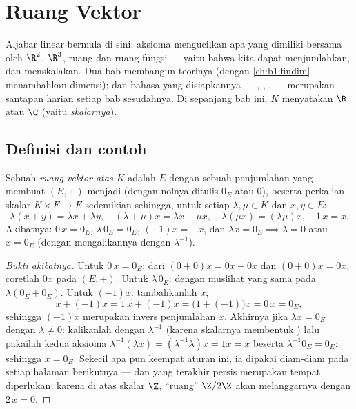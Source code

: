 \chapter{Ruang Vektor}\label{ch:b1:vspaces}

Aljabar linear bermula di sini: aksioma  mengucilkan apa yang
dimiliki bersama oleh $\R^2$, $\R^3$, ruang  dan ruang fungsi
--- yaitu bahwa kita dapat menjumlahkan, dan menskalakan. Dua bab membangun teorinya
(dengan \cref{ch:b1:findim} menambahkan dimensi); dan bahasa yang disiapkannya ---
, , ,  --- merupakan santapan harian setiap
bab sesudahnya. Di sepanjang bab ini, $K$ menyatakan $\R$ atau $\C$
(yaitu \emph{skalarnya}).

\section{Definisi dan contoh}

\begin{definition}\label{def:b1:vspaces:def}
Sebuah \emph{ruang vektor atas $K$} adalah  $E$ dengan sebuah
penjumlahan yang membuat $(E, +)$ menjadi  (dengan nolnya ditulis $0_E$ atau
$0$), beserta perkalian skalar $K \times E \to E$ sedemikian sehingga, untuk
setiap $\lambda, \mu \in K$ dan $x, y \in E$:
\[
\lambda(x + y) = \lambda x + \lambda y,\quad
(\lambda + \mu) x = \lambda x + \mu x,\quad
\lambda(\mu x) = (\lambda\mu) x,\quad
1\,x = x .
\]
Akibatnya: $0\,x = 0_E$, $\lambda\,0_E = 0_E$, $(-1)x = -x$, dan
$\lambda x = 0_E \implies \lambda = 0$ atau $x = 0_E$ (dengan mengalikannya dengan
$\lambda^{-1}$).
\end{definition}

\begin{proof}[Bukti akibatnya]
Untuk $0\,x = 0_E$: dari $(0 + 0)x = 0x + 0x$ dan $(0+0)x = 0x$,
coretlah $0x$ pada  $(E, +)$. Untuk $\lambda\,0_E$: dengan muslihat
yang sama pada $\lambda(0_E + 0_E)$. Untuk $(-1)x$: tambahkanlah $x$,
\[
x + (-1)x = 1\,x + (-1)x = \bigl(1 + (-1)\bigr)x = 0\,x = 0_E ,
\]
sehingga $(-1)x$ merupakan invers penjumlahan $x$. Akhirnya jika $\lambda x
= 0_E$ dengan $\lambda \neq 0$: kalikanlah dengan $\lambda^{-1}$ (karena
skalarnya membentuk ) lalu pakailah kedua aksioma
$\lambda^{-1}(\lambda x) = (\lambda^{-1}\lambda)x = 1x = x$
beserta $\lambda^{-1}0_E = 0_E$: sehingga $x = 0_E$. Sekecil apa pun
keempat aturan ini, ia dipakai diam-diam pada setiap halaman
berikutnya --- dan yang terakhir persis merupakan tempat  diperlukan:
karena di atas skalar $\Z$, ``ruang'' $\Z/2\Z$ akan melanggarnya
dengan $2\,x = 0$.
\end{proof}

